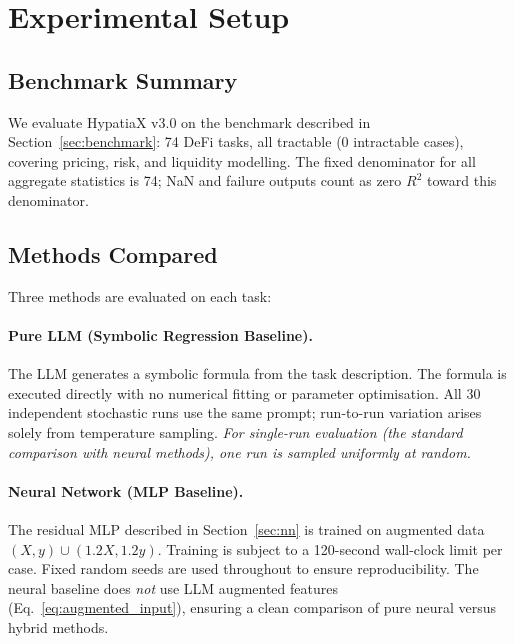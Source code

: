 \documentclass[twoside,11pt]{article}
\newcommand{\Rsq}{R^{2}}
\begin{document}
\section{Experimental Setup}
\label{sec:setup}

\subsection{Benchmark Summary}\label{subsec:benchmark-summary}
\label{sec:setup_summary}

We evaluate HypatiaX v3.0 on the benchmark described in Section~\ref{sec:benchmark}:
74 DeFi tasks, all tractable (0 intractable cases), covering pricing, risk, and
liquidity modelling.  The fixed denominator for all aggregate statistics is 74;
NaN and failure outputs count as zero $\Rsq$ toward this denominator.

\subsection{Methods Compared}\label{subsec:methods-compared}
\label{sec:setup_methods}

Three methods are evaluated on each task:

\paragraph{Pure LLM (Symbolic Regression Baseline).}
The LLM generates a symbolic formula from the task description.  The formula is
executed directly with no numerical fitting or parameter optimisation.  All 30
independent stochastic runs use the same prompt; run-to-run variation arises
solely from temperature sampling.  \emph{For single-run evaluation (the standard
comparison with neural methods), one run is sampled uniformly at random.}

\paragraph{Neural Network (MLP Baseline).}
The residual MLP described in Section~\ref{sec:nn} is trained on augmented data
$(X, y) \cup (1.2X, 1.2y)$.  Training is subject to a 120-second wall-clock
limit per case.  Fixed random seeds are used throughout to ensure reproducibility.
The neural baseline does \emph{not} use LLM augmented features (Eq.~\ref{eq:augmented_input}),
ensuring a clean comparison of pure neural versus hybrid methods.
\end{document}
